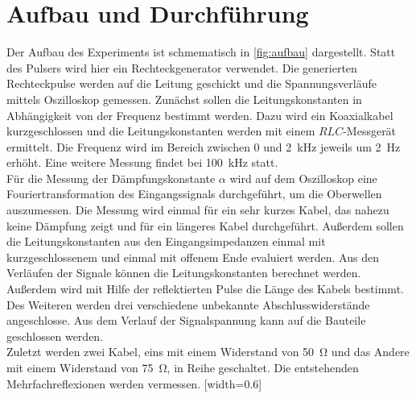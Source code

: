 \section {Aufbau und Durchführung}
\label{sec:durchführung}
Der Aufbau des Experiments ist schmematisch in \autoref{fig:aufbau} dargestellt. Statt des Pulsers wird hier ein Rechteckgenerator verwendet. Die generierten Rechteckpulse werden auf die Leitung geschickt und die Spannungsverläufe mittels Oszilloskop gemessen.
Zunächst sollen die Leitungskonstanten in Abhängigkeit von der Frequenz bestimmt werden. Dazu wird ein Koaxialkabel kurzgeschlossen und die Leitungskonstanten werden mit einem $RLC$-Messgerät ermittelt. Die Frequenz wird im Bereich zwischen 0 und \SI{2}{\kilo\hertz} jeweils um \SI{2}{\hertz} erhöht. Eine weitere Messung findet bei \SI{100}{\kilo\hertz} statt. \\
Für die Messung der Dämpfungskonstante $\alpha$ wird auf dem Oszilloskop eine Fouriertransformation des Eingangssignals durchgeführt, um die Oberwellen auszumessen. Die Messung wird einmal für ein sehr kurzes Kabel, das nahezu keine Dämpfung zeigt und für ein längeres Kabel durchgeführt.
Außerdem sollen die Leitungskonstanten aus den Eingangsimpedanzen einmal mit kurzgeschlossenem und einmal mit offenem Ende evaluiert werden. Aus den Verläufen der Signale können die Leitungskonstanten berechnet werden. Außerdem wird mit Hilfe der reflektierten Pulse die Länge des Kabels bestimmt.\\
Des Weiteren werden drei verschiedene unbekannte Abschlusswiderstände angeschlosse. Aus dem Verlauf der Signalspannung kann auf die Bauteile geschlossen werden.\\
Zuletzt werden zwei Kabel, eins mit einem Widerstand von \SI{50}{\ohm} und das Andere mit einem Widerstand von \SI{75}{\ohm}, in Reihe geschaltet. Die entstehenden Mehrfachreflexionen werden vermessen.
[width=0.6\textwidth]
